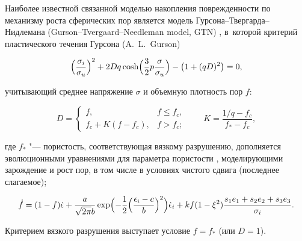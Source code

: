 Наиболее известной связанной моделью накопления поврежденности по механизму роста сферических пор является модель Гурсона--Твергарда--Нид\-ле\-мана (Gurson–Tvergaard–Needleman model, {\small\sc GTN}) \cite{keller:bib:gtn, keller:bib:vlas1}, в~которой критерий пластического течения Гурсона (A.~L.~Gurson) \cite{keller:bib:gurson}  

\begin{equation}\label{keller:eq:gurson}

	\Bigl(\frac{\sigma_i}{\sigma_u}\Bigr)^2+2D q\cosh\Bigl(\frac{3}{2}p\frac{\sigma}{\sigma_u}\Bigr)-

	\bigl(1+(q D)^2\bigr)=0,

\end{equation}

учитывающий среднее напряжение $\sigma$ и объемную плотность пор $f$: 

\begin{equation}\label{keller:eq:gurson2}

	D=

\left\{	

	\begin{array}{cc}

	f,& f\leq f_c,\\

	f_c+K(f-f_c),& f>f_c	;

	\end{array}

\right. \qquad K=\frac{1/q-f_c}{f_{\ast}-f_c},

\end{equation}

где $f_{\ast}$ "--- пористость, соответствующая вязкому разрушению, дополняется эволюционными уравнениями для параметра пористости \cite{keller:bib:gtn,  keller:bib:trianta, keller:bib:hutch}, моделирующими зарождение и рост пор, в том числе в условиях чистого сдвига (последнее слагаемое);

\begin{equation}\label{keller:eq:gurson2}

	\dot{f}=(1-f)\dot{\epsilon}+\frac{a}{\sqrt{2\pi}b}\exp\Bigl(-\frac{1}{2}\Bigl(\frac{\epsilon_i-c}{b}\Bigr)^2\Bigr)\dot{\epsilon}_i+k f(1-\xi^2)\frac{s_1e_1+s_2e_2+s_3e_3}{\sigma_i}.

\end{equation}

Критерием вязкого разрушения выступает условие $f=f_{\ast}$ (или $D=1$).



